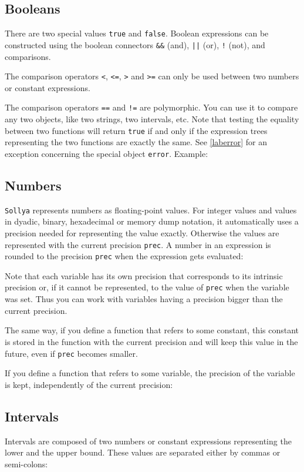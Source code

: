 \documentclass[a4paper]{article}
\newcommand{\com}[1]{\texttt{#1}}
\newcommand{\key}[1]{\texttt{#1}}
\newcommand{\sollya}{\texttt{Sollya}\xspace}
\begin{document}
\subsection{Booleans}
There are two special values \key{true} and \key{false}. Boolean expressions can be constructed using the boolean connectors \key{\&\&} (and), \key{||} (or), \key{!} (not), and comparisons.

The comparison operators \key{<}, \key{<=}, \key{>} and \key{>=} can only be used between two numbers or constant expressions.

The comparison operators \key{==} and \key{!=} are polymorphic. You can use it to compare any two objects, like two strings, two intervals, etc. Note that testing the equality between two functions will return \key{true} if and only if the expression trees representing the two functions are exactly the same. See \ref{laberror} for an exception concerning the special object \key{error}. Example:



\subsection{Numbers}
\sollya represents numbers as floating-point values. For integer values and values in dyadic, binary, hexadecimal or memory dump notation, it 
automatically uses a precision needed for representing the value exactly. Otherwise the values are represented with the current precision \com{prec}. A number in an expression is rounded to the precision \com{prec} when the expression gets evaluated:



Note that each variable has its own precision that corresponds to its intrinsic precision or, if it cannot be represented, to the value of \com{prec} when the variable was set. Thus you can work with variables having a precision bigger than the current precision.

The same way, if you define a function that refers to some constant, this constant is stored in the function with the current precision and will keep this value in the future, even if \com{prec} becomes smaller.

If you define a function that refers to some variable, the precision of the variable is kept, independently of the current precision:



\subsection{Intervals}
Intervals are composed of two numbers or constant expressions representing the lower and the upper bound. These values are separated either by commas or semi-colons:
\end{document}
